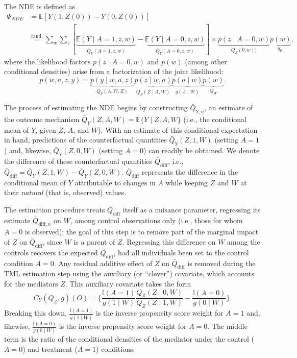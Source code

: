 \documentclass[
  12pt, krantz2,
]{krantz}
\theoremstyle{definition}
\theoremstyle{definition}
\theoremstyle{definition}
\newcommand{\E}{\mathbb{E}}
\newcommand{\1}{\mathbbm{1}}
\begin{document}
The NDE is defined as
\begin{align*}
  \Psi_{NDE} &= \E[Y(1, Z(0)) - Y(0, Z(0))] \\
  &\overset{\text{rand.}}{=} \sum_w \sum_z
  [\underbrace{\E(Y \mid A = 1, z, w)}_{\bar{Q}_Y(A = 1, z, w)} -
  \underbrace{\E(Y \mid A = 0, z, w)}_{\bar{Q}_Y(A = 0, z, w)}] \times
  \underbrace{p(z \mid A = 0, w)}_{Q_Z(0, w))} \underbrace{p(w)}_{q_W},
\end{align*}
where the likelihood factors \(p(z \mid A = 0, w)\) and \(p(w)\) (among other
conditional densities) arise from a factorization of the joint likelihood:
\begin{equation*}
  p(w, a, z, y) = \underbrace{p(y \mid w, a, z)}_{Q_Y(A, W, Z)}
  \underbrace{p(z \mid w, a)}_{Q_Z(Z \mid A, W)}
  \underbrace{p(a \mid w)}_{g(A \mid W)}
  \underbrace{p(w)}_{Q_W}.
\end{equation*}

The process of estimating the NDE begins by constructing \(\bar{Q}_{Y, n}\), an
estimate of the outcome mechanism \(\bar{Q}_Y(Z, A, W) = \E \{Y \mid Z, A, W\}\) (i.e., the conditional mean of \(Y\), given \(Z\), \(A\), and \(W\)). With an
estimate of this conditional expectation in hand, predictions of the
counterfactual quantities \(\bar{Q}_Y(Z, 1, W)\) (setting \(A = 1\)) and, likewise,
\(\bar{Q}_Y(Z, 0, W)\) (setting \(A = 0\)) can readily be obtained. We denote the
difference of these counterfactual quantities \(\bar{Q}_{\text{diff}}\), i.e.,
\(\bar{Q}_{\text{diff}} = \bar{Q}_Y(Z, 1, W) - \bar{Q}_Y(Z, 0, W)\).
\(\bar{Q}_{\text{diff}}\) represents the difference in the conditional mean of
\(Y\) attributable to changes in \(A\) while keeping \(Z\) and \(W\) at their \emph{natural}
(that is, observed) values.

The estimation procedure treats \(\bar{Q}_{\text{diff}}\) itself as a nuisance
parameter, regressing its estimate \(\bar{Q}_{\text{diff}, n}\) on \(W\), among
control observations only (i.e., those for whom \(A = 0\) is observed); the goal
of this step is to remove part of the marginal impact of \(Z\) on
\(\bar{Q}_{\text{diff}}\), since \(W\) is a parent of \(Z\). Regressing this
difference on \(W\) among the controls recovers the expected
\(\bar{Q}_{\text{diff}}\), had all individuals been set to the control condition
\(A = 0\). Any residual additive effect of \(Z\) on \(\bar{Q}_{\text{diff}}\) is
removed during the TML estimation step using the auxiliary (or ``clever'')
covariate, which accounts for the mediators \(Z\). This auxiliary covariate takes
the form
\begin{equation*}
  C_Y(Q_Z, g)(O) = \Bigg\{\frac{\mathbb{I}(A = 1)}{g(1 \mid W)}
  \frac{Q_Z(Z \mid 0, W)}{Q_Z(Z \mid 1, W)} -
  \frac{\mathbb{I}(A = 0)}{g(0 \mid W)} \Bigg\}.
\end{equation*}
Breaking this down, \(\frac{\mathbb{I}(A = 1)}{g(1 \mid W)}\) is the inverse
propensity score weight for \(A = 1\) and, likewise, \(\frac{\mathbb{I}(A = 0)} {g(0 \mid W)}\) is the inverse propensity score weight for \(A = 0\). The middle
term is the ratio of the conditional densities of the mediator under the control
(\(A = 0\)) and treatment (\(A = 1\)) conditions.
\end{document}
